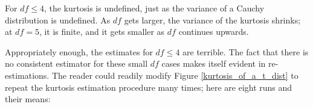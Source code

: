 \begin{center}
\end{center}

For $df\leq 4$, the kurtosis is undefined, just as the
variance of a Cauchy distribution is undefined. As  $df$ gets larger,
the variance of the kurtosis shrinks; at $df = 5$, it is finite, and it
gets smaller as $df$ continues upwards.

Appropriately enough, the estimates for $df\leq 4$ are terrible.  
The fact that there is no consistent estimator for these small 
$df$ cases makes itself evident in re-estimations. The reader could readily
modify Figure \ref{kurtosis_of_a_t_dist} to repeat the kurtosis estimation
procedure many times; here are eight runs and their means:

